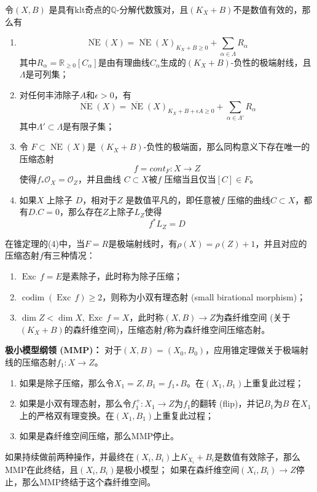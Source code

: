 \begin{theorem}[锥定理]\label{conethm}

令$(X,B)$ 是具有klt奇点的$\mathbb{Q}$-分解代数簇对，且$(K_{X}+B)$不是数值有效的，那么有
\begin{enumerate}
  \item
    \[ \overline{\operatorname{NE}}(X)=\overline{\operatorname{NE}}(X)_{K_{X}+B\geqslant 0} +\sum_{\alpha \in\Lambda} R_{\alpha}\] 
          其中$R_{\alpha}=\mathbb{R}_{\geqslant 0}[C_{\alpha}]$是由有理曲线$C_{\alpha}$生成的$(K_{X}+B) $-负性的极端射线，且$\Lambda$是可列集；
  \item 对任何丰沛除子$A$和$ \epsilon >0 $，有
        \[ \overline{\operatorname{NE}}(X)=\overline{\operatorname{NE}}(X)_{K_{X}+B+\epsilon A\geqslant 0} +\sum_{\alpha \in\Lambda'}R_{\alpha} \]
        其中$\Lambda' \subset \Lambda$是有限子集；
  \item 令 $F \subset \overline{\operatorname{NE}}(X)$是 $(K_{X}+B)$-负性的极端面，那么同构意义下存在唯一的压缩态射
    \[ f=cont_{F}:X \to Z \]
    使得$f_{*}\mathcal{O}_{X}=\mathcal{O}_{Z}$，并且曲线 $C \subset X$被$f$ 压缩当且仅当$[C] \in F$。 
  \item 如果$X$ 上除子 $D$，相对于$Z$ 是数值平凡的，即任意被$f$ 压缩的曲线$C \subset X$，都有$D.C=0$，那么存在$Z$上除子$L_{Z} $使得
    \[ f^{*}L_{Z} = D \]
\end{enumerate}
\end{theorem}
在锥定理的(4)中，当$F=R$是极端射线时，有$\rho(X)=\rho(Z)+1$，并且对应的压缩态射$f$有三种情况：
\begin{enumerate}
  \item $\operatorname{Exc}\,f=E$是素除子，此时称为除子压缩；
  \item $\operatorname{codim }(\operatorname{Exc}\,f) \geqslant 2$，则称为小双有理态射 (small birational morphism)；
  \item $\dim Z < \dim X, \operatorname{Exc}\,f=X$，此时称$(X,B)\to Z$为森纤维空间 (关于$ (K_{X}+B) $的森纤维空间)，压缩态射$f$称为森纤维空间压缩态射。
\end{enumerate}
\textbf{极小模型纲领 (MMP)：}
对于$(X,B)=(X_{0},B_{0})$，应用锥定理做关于极端射线的压缩态射$f_{1}:X\to Z$。
\begin{enumerate}
  \item 如果是除子压缩，那么令$X_{1}=Z,B_{1}=f_{1*}B$。在$(X_{1},B_{1})$上重复此过程；
  \item 如果是小双有理态射，那么令$f^{+}_{1}:X_{1}\to Z$为$f_{1}$的翻转 (flip)，并记$B_{1}$为$B$ 在$X_{1}$上的严格双有理变换。在$(X_{1},B_{1})$上重复此过程；
  \item 如果是森纤维空间压缩，那么MMP停止。
\end{enumerate}
如果持续做前两种操作，并最终在$(X_{i},B_{i})$上$K_{X_{i}}+B_{i}$是数值有效除子，那么MMP在此终结，且$(X_{i},B_{i})$是极小模型；
如果在森纤维空间$(X_{i},B_{i})\to Z$停止，那么MMP终结于这个森纤维空间。


